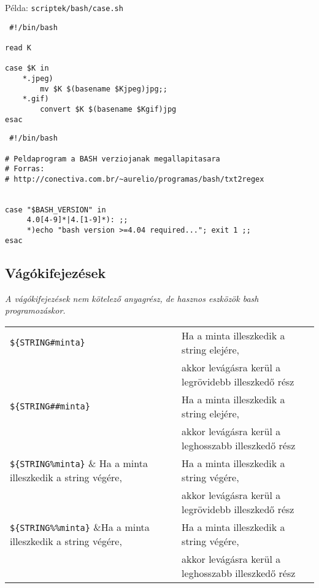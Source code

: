\begin{minipage}{0.425\textwidth}
Példa: \texttt{scriptek/bash/case.sh}
%

\lstset{linewidth=\textwidth}
\begin{lstlisting}
 #!/bin/bash

read K

case $K in
    *.jpeg)
        mv $K $(basename $Kjpeg)jpg;;
    *.gif)
        convert $K $(basename $Kgif)jpg
esac
\end{lstlisting}
\end{minipage}
\hspace{1em}
\begin{minipage}{0.425\textwidth}
\lstset{linewidth=\textwidth}
\begin{lstlisting}
 #!/bin/bash

# Peldaprogram a BASH verziojanak megallapitasara
# Forras: 
# http://conectiva.com.br/~aurelio/programas/bash/txt2regex


case "$BASH_VERSION" in
     4.0[4-9]*|4.[1-9]*): ;;
     *)echo "bash version >=4.04 required..."; exit 1 ;;
esac
\end{lstlisting}
\end{minipage}


\subsection{Vágókifejezések}
\emph{A vágókifejezések nem kötelező anyagrész, de hasznos eszközök bash programozáskor.}

\begin{center}
 \begin{tabular}{|ll|}
\hline
\verb.${STRING#minta}.	& Ha a minta illeszkedik a string elejére, \\
			&  akkor levágásra kerül a legrövidebb illeszkedő rész
\\
\hline
\verb.${STRING##minta}.	& Ha a minta illeszkedik a string elejére, \\
			&  akkor levágásra kerül a leghosszabb illeszkedő rész
\\
\hline
\verb.${STRING%minta}. 	& Ha a minta illeszkedik a string végére, \\
			&  akkor levágásra kerül a legrövidebb illeszkedő rész
\\
\hline
\verb.${STRING%%minta}.	&Ha a minta illeszkedik a string végére,\\
			&	akkor levágásra kerül a leghosszabb illeszkedő rész
\\
\hline  
 \end{tabular}
\end{center}

